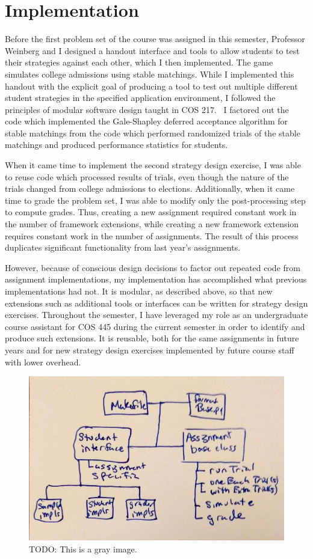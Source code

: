 \documentclass[pageno]{jpaper}
\begin{document}
\section*{Implementation}
Before the first problem set of the course was assigned in this semester, Professor Weinberg and I designed a handout interface and tools to allow students to test their strategies against each other, which I then implemented.
The game simulates college admissions using stable matchings.
While I implemented this handout with the explicit goal of producing a tool to test out multiple different student strategies in the specified application environment, I followed the principles of modular software design taught in COS 217.~\cite{Kernighan and Pike chapter 4}
I factored out the code which implemented the Gale-Shapley deferred acceptance algorithm for stable matchings from the code which performed randomized trials of the stable matchings and produced performance statistics for students.

When it came time to implement the second strategy design exercise, I was able to reuse code which processed results of trials, even though the nature of the trials changed from college admissions to elections.
Additionally, when it came time to grade the problem set, I was able to modify only the post-processing step to compute grades.
Thus, creating a new assignment required constant work in the number of framework extensions, while creating a new framework extension requires constant work in the number of assignments.
The result of this process duplicates significant functionality from last year's assignments.

However, because of conscious design decisions to factor out repeated code from assignment implementations, my implementation has accomplished what previous implementations had not.
It is modular, as described above, so that new extensions such as additional tools or interfaces can be written for strategy design exercises.
Throughout the semester, I have leveraged my role as an undergraduate course assistant for COS 445 during the current semester in order to identify and produce such extensions.
It is reusable, both for the same assignments in future years and for new strategy design exercises implemented by future course staff with lower overhead.
\begin{figure}[hbt]
  \centering
  \includegraphics[width=0.75\linewidth]{Handwritten_Diagram.jpg}
  \caption{TODO: This is a gray image.}\label{fig:gray}
\end{figure}
\end{document}
